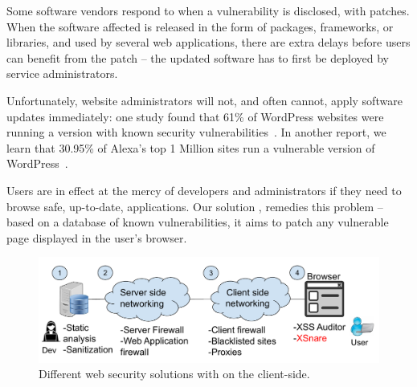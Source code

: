 Some software vendors respond to \xss when a vulnerability is
disclosed, with patches. When the software affected is released in
the form of packages, frameworks, or libraries, and used by several
web applications, there are extra delays before users can benefit from
the patch -- the updated software has to first be deployed by service
administrators.

Unfortunately, website administrators will not, and often cannot,
apply software updates immediately: one study found
that 61\% of WordPress websites were running a version with known
security vulnerabilities~\cite{Sucuri}. In another report, we learn
that 30.95\% of Alexa's top 1 Million sites run a vulnerable version
of WordPress~\cite{wpwhitesecurity}.

Users are in effect at the mercy of developers and administrators if
they need to browse safe, up-to-date, applications. Our solution \sys,
remedies this problem -- based on a database of known vulnerabilities,
it aims to patch any vulnerable page displayed in the user's browser.

\begin{figure}[h]
  \includegraphics[scale=0.37]{img/web_app_architecture.pdf}
  \vspace*{-5.0ex}
  \caption{Different web security solutions with \sys on the client-side.}
  \label{fig:web_architecture}
\end{figure}

